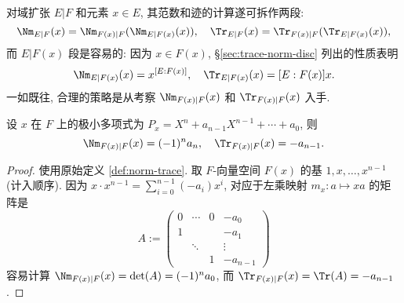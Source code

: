 对域扩张 $E|F$ 和元素 $x \in E$, 其范数和迹的计算遂可拆作两段:
\[ \Nm_{E|F}(x) = \Nm_{F(x)|F}(\Nm_{E|F(x)}(x)), \quad \Tr_{E|F}(x)=\Tr_{F(x)|F}(\Tr_{E|F(x)}(x)), \]
而 $E|F(x)$ 段是容易的: 因为 $x \in F(x)$, \S\ref{sec:trace-norm-disc} 列出的性质表明
\begin{gather}\label{eqn:norm-trace-field-prepa}
	\Nm_{E|F(x)}(x) = x^{[E:F(x)]}, \quad \Tr_{E|F(x)}(x) = [E:F(x)] x.
\end{gather}
一如既往, 合理的策略是从考察 $\Nm_{F(x)|F}(x)$ 和 $\Tr_{F(x)|F}(x)$ 入手.

\begin{theorem}\label{prop:norm-trace-F(x)}
	设 $x$ 在 $F$ 上的极小多项式为 $P_x = X^n + a_{n-1}X^{n-1} + \cdots + a_0$, 则
	\[ \Nm_{F(x)|F}(x) = (-1)^n a_n, \quad \Tr_{F(x)|F}(x) = -a_{n-1}. \]
\end{theorem}
\begin{proof}
	使用原始定义 \ref{def:norm-trace}. 取 $F$-向量空间 $F(x)$ 的基 $1, x, \ldots, x^{n-1}$ (计入顺序). 因为 $x \cdot x^{n-1} = \sum_{i=0}^{n-1} (-a_i)x^i$, 对应于左乘映射 $m_x: a \mapsto xa$ 的矩阵是
	\[ A := \begin{pmatrix}
		0 & \cdots & 0 & -a_0 \\
		1 & & & -a_1 \\
		& \ddots & & \vdots \\
		& & 1 & -a_{n-1}
	\end{pmatrix}\]
	容易计算 $\Nm_{F(x)|F}(x) = \det(A) = (-1)^n a_0$, 而 $\Tr_{F(x)|F}(x) = \Tr(A) = -a_{n-1}$.
\end{proof}

